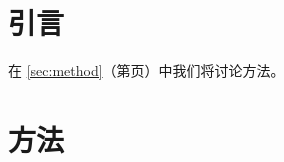 \documentclass{ctexart}
\begin{document}
\section{引言}\label{sec:intro}
在 \autoref{sec:method}（第\pageref{sec:method}页）中我们将讨论方法。

\section{方法}\label{sec:method}
\end{document}
